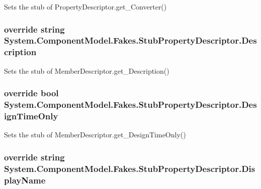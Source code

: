Sets the stub of Property\-Descriptor.\-get\-\_\-\-Converter()

\hypertarget{class_system_1_1_component_model_1_1_fakes_1_1_stub_property_descriptor_afd93ab47e1b8c72d40cffca5c7e35841}{
\subsubsection[{Description}]{\setlength{\rightskip}{0pt plus 5cm}override string System.\-Component\-Model.\-Fakes.\-Stub\-Property\-Descriptor.\-Description\hspace{0.3cm}{\ttfamily [get]}}}\label{class_system_1_1_component_model_1_1_fakes_1_1_stub_property_descriptor_afd93ab47e1b8c72d40cffca5c7e35841}


Sets the stub of Member\-Descriptor.\-get\-\_\-\-Description()

\hypertarget{class_system_1_1_component_model_1_1_fakes_1_1_stub_property_descriptor_ae65b8d1acd8a4079c79ba8fce812f677}{
\subsubsection[{Design\-Time\-Only}]{\setlength{\rightskip}{0pt plus 5cm}override bool System.\-Component\-Model.\-Fakes.\-Stub\-Property\-Descriptor.\-Design\-Time\-Only\hspace{0.3cm}{\ttfamily [get]}}}\label{class_system_1_1_component_model_1_1_fakes_1_1_stub_property_descriptor_ae65b8d1acd8a4079c79ba8fce812f677}


Sets the stub of Member\-Descriptor.\-get\-\_\-\-Design\-Time\-Only()

\hypertarget{class_system_1_1_component_model_1_1_fakes_1_1_stub_property_descriptor_ae68232f956fcbae25968d59e5df84b1c}{
\subsubsection[{Display\-Name}]{\setlength{\rightskip}{0pt plus 5cm}override string System.\-Component\-Model.\-Fakes.\-Stub\-Property\-Descriptor.\-Display\-Name\hspace{0.3cm}{\ttfamily [get]}}}\label{class_system_1_1_component_model_1_1_fakes_1_1_stub_property_descriptor_ae68232f956fcbae25968d59e5df84b1c}


